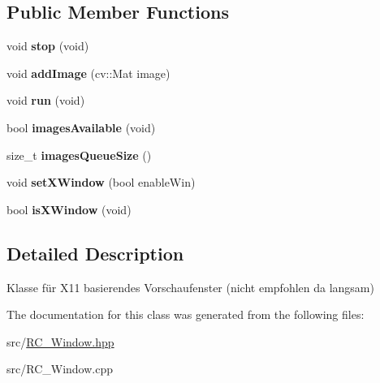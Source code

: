 \subsection*{Public Member Functions}
\begin{DoxyCompactItemize}
\item 
\hypertarget{classrc_1_1Window_a115530da5a987d8c241b0febc3cddc8f}{void {\bfseries stop} (void)}\label{classrc_1_1Window_a115530da5a987d8c241b0febc3cddc8f}

\item 
\hypertarget{classrc_1_1Window_a922ff36f569afe178403740df2e24604}{void {\bfseries add\+Image} (cv\+::\+Mat image)}\label{classrc_1_1Window_a922ff36f569afe178403740df2e24604}

\item 
\hypertarget{classrc_1_1Window_a15681842c7ce0ee6b9201cfa973d2ac1}{void {\bfseries run} (void)}\label{classrc_1_1Window_a15681842c7ce0ee6b9201cfa973d2ac1}

\item 
\hypertarget{classrc_1_1Window_a7cb65cbb3741a7711631f66c46c7b039}{bool {\bfseries images\+Available} (void)}\label{classrc_1_1Window_a7cb65cbb3741a7711631f66c46c7b039}

\item 
\hypertarget{classrc_1_1Window_a3c221423c38f30757d042b2621f22894}{size\+\_\+t {\bfseries images\+Queue\+Size} ()}\label{classrc_1_1Window_a3c221423c38f30757d042b2621f22894}

\item 
\hypertarget{classrc_1_1Window_a6acba37a50975d7315818d1a9722c7dc}{void {\bfseries set\+X\+Window} (bool enable\+Win)}\label{classrc_1_1Window_a6acba37a50975d7315818d1a9722c7dc}

\item 
\hypertarget{classrc_1_1Window_abd9877b14cf84b02e7c6ea54c23bc082}{bool {\bfseries is\+X\+Window} (void)}\label{classrc_1_1Window_abd9877b14cf84b02e7c6ea54c23bc082}

\end{DoxyCompactItemize}


\subsection{Detailed Description}
Klasse für X11 basierendes Vorschaufenster (nicht empfohlen da langsam) 

The documentation for this class was generated from the following files\+:\begin{DoxyCompactItemize}
\item 
src/\hyperlink{RC__Window_8hpp}{R\+C\+\_\+\+Window.\+hpp}\item 
src/R\+C\+\_\+\+Window.\+cpp\end{DoxyCompactItemize}
